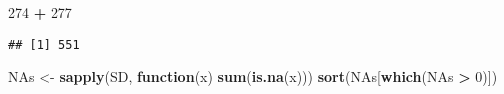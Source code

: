 \documentclass[]{article}
\newenvironment{Shaded}{\begin{snugshade}}{\end{snugshade}}
\newcommand{\KeywordTok}[1]{\textcolor[rgb]{0.13,0.29,0.53}{\textbf{#1}}}
\newcommand{\DecValTok}[1]{\textcolor[rgb]{0.00,0.00,0.81}{#1}}
\newcommand{\StringTok}[1]{\textcolor[rgb]{0.31,0.60,0.02}{#1}}
\newcommand{\ControlFlowTok}[1]{\textcolor[rgb]{0.13,0.29,0.53}{\textbf{#1}}}
\newcommand{\OperatorTok}[1]{\textcolor[rgb]{0.81,0.36,0.00}{\textbf{#1}}}
\newcommand{\NormalTok}[1]{#1}
\begin{document}
\begin{Shaded}
\begin{Highlighting}[]
\DecValTok{274} \OperatorTok{+}\StringTok{ }\DecValTok{277}
\end{Highlighting}
\end{Shaded}

\begin{verbatim}
## [1] 551
\end{verbatim}

\begin{Shaded}
\begin{Highlighting}[]
\NormalTok{NAs <-}\StringTok{ }\KeywordTok{sapply}\NormalTok{(SD, }\ControlFlowTok{function}\NormalTok{(x) }\KeywordTok{sum}\NormalTok{(}\KeywordTok{is.na}\NormalTok{(x)))}
\KeywordTok{sort}\NormalTok{(NAs[}\KeywordTok{which}\NormalTok{(NAs }\OperatorTok{>}\StringTok{ }\DecValTok{0}\NormalTok{)]) }
\end{Highlighting}
\end{Shaded}
\end{document}
